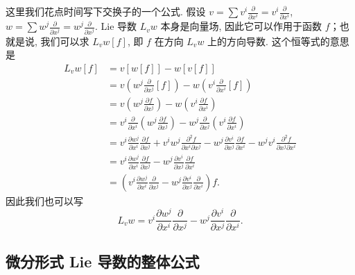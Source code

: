 这里我们花点时间写下交换子的一个公式. 假设 $v=\sum v^i\frac{\partial}{\partial x^i}=v^i\frac{\partial}{\partial x^i}$, $w=\sum w^j\frac{\partial}{\partial x^j}=w^j\frac{\partial}{\partial x^j}$. Lie 导数 $L_vw$ 本身是向量场, 因此它可以作用于函数 $f$；也就是说, 我们可以求 $L_vw[f]$, 即 $f$ 在方向 $L_vw$ 上的方向导数. 这个恒等式的意思是
\begin{align*}
L_vw[f]&=v\left[w[f]\right]-w\left[v[f]\right]\\
&=v\left(w^j\frac{\partial}{\partial x^j}[f]\right)-w\left(v^i\frac{\partial}{\partial x^i}[f]\right)\\
&=v\left(w^j\frac{\partial f}{\partial x^j}\right)-w\left(v^i\frac{\partial f}{\partial x^i}\right)\\
&=v^i\frac{\partial}{\partial x^i}\left(w^j\frac{\partial f}{\partial x^j}\right)-w^j\frac{\partial}{\partial x^j}\left(v^i\frac{\partial f}{\partial x^i}\right)\\
&=v^i\frac{\partial w^j}{\partial x^i}\frac{\partial f}{\partial x^j}+v^iw^j\frac{\partial^2f}{\partial x^i\partial x^j}-w^j\frac{\partial v^i}{\partial x^j}\frac{\partial f}{\partial x^i}-w^jv^i\frac{\partial^2f}{\partial x^j\partial x^i}\\
&=v^i\frac{\partial w^j}{\partial x^i}\frac{\partial f}{\partial x^j}-w^j\frac{\partial v^i}{\partial x^j}\frac{\partial f}{\partial x^i}\\
&=\left(v^i\frac{\partial w^j}{\partial x^i}\frac{\partial}{\partial x^j}-w^j\frac{\partial v^i}{\partial x^j}\frac{\partial}{\partial x^i}\right)f.
\end{align*}
因此我们也可以写
\[
L_vw=v^i\frac{\partial w^j}{\partial x^i}\frac{\partial}{\partial x^j}-w^j\frac{\partial v^i}{\partial x^j}\frac{\partial}{\partial x^i}.
\]

\subsection{微分形式 Lie 导数的整体公式}

